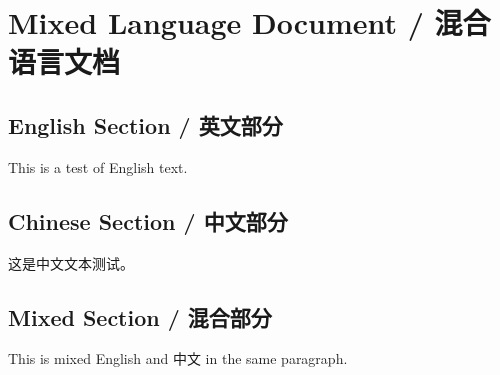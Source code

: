 \hypertarget{mixed-language-document-ux6df7ux5408ux8bedux8a00ux6587ux6863}{%
\section{Mixed Language Document /
混合语言文档}\label{mixed-language-document-ux6df7ux5408ux8bedux8a00ux6587ux6863}}

\hypertarget{english-section-ux82f1ux6587ux90e8ux5206}{%
\subsection{English Section /
英文部分}\label{english-section-ux82f1ux6587ux90e8ux5206}}

This is a test of English text.

\hypertarget{chinese-section-ux4e2dux6587ux90e8ux5206}{%
\subsection{Chinese Section /
中文部分}\label{chinese-section-ux4e2dux6587ux90e8ux5206}}

这是中文文本测试。

\hypertarget{mixed-section-ux6df7ux5408ux90e8ux5206}{%
\subsection{Mixed Section /
混合部分}\label{mixed-section-ux6df7ux5408ux90e8ux5206}}

This is mixed English and 中文 in the same paragraph.
